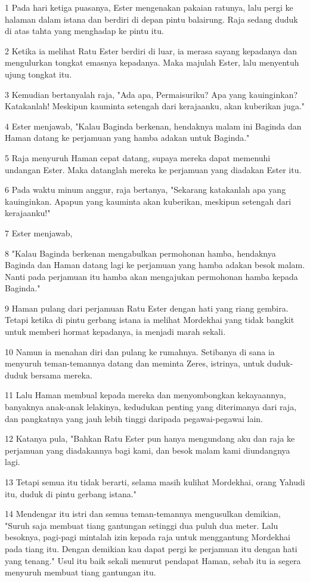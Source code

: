 \par 1 Pada hari ketiga puasanya, Ester mengenakan pakaian ratunya, lalu pergi ke halaman dalam istana dan berdiri di depan pintu balairung. Raja sedang duduk di atas tahta yang menghadap ke pintu itu.
\par 2 Ketika ia melihat Ratu Ester berdiri di luar, ia merasa sayang kepadanya dan mengulurkan tongkat emasnya kepadanya. Maka majulah Ester, lalu menyentuh ujung tongkat itu.
\par 3 Kemudian bertanyalah raja, "Ada apa, Permaisuriku? Apa yang kauinginkan? Katakanlah! Meskipun kauminta setengah dari kerajaanku, akan kuberikan juga."
\par 4 Ester menjawab, "Kalau Baginda berkenan, hendaknya malam ini Baginda dan Haman datang ke perjamuan yang hamba adakan untuk Baginda."
\par 5 Raja menyuruh Haman cepat datang, supaya mereka dapat memenuhi undangan Ester. Maka datanglah mereka ke perjamuan yang diadakan Ester itu.
\par 6 Pada waktu minum anggur, raja bertanya, "Sekarang katakanlah apa yang kauinginkan. Apapun yang kauminta akan kuberikan, meskipun setengah dari kerajaanku!"
\par 7 Ester menjawab,
\par 8 "Kalau Baginda berkenan mengabulkan permohonan hamba, hendaknya Baginda dan Haman datang lagi ke perjamuan yang hamba adakan besok malam. Nanti pada perjamuan itu hamba akan mengajukan permohonan hamba kepada Baginda."
\par 9 Haman pulang dari perjamuan Ratu Ester dengan hati yang riang gembira. Tetapi ketika di pintu gerbang istana ia melihat Mordekhai yang tidak bangkit untuk memberi hormat kepadanya, ia menjadi marah sekali.
\par 10 Namun ia menahan diri dan pulang ke rumahnya. Setibanya di sana ia menyuruh teman-temannya datang dan meminta Zeres, istrinya, untuk duduk-duduk bersama mereka.
\par 11 Lalu Haman membual kepada mereka dan menyombongkan kekayaannya, banyaknya anak-anak lelakinya, kedudukan penting yang diterimanya dari raja, dan pangkatnya yang jauh lebih tinggi daripada pegawai-pegawai lain.
\par 12 Katanya pula, "Bahkan Ratu Ester pun hanya mengundang aku dan raja ke perjamuan yang diadakannya bagi kami, dan besok malam kami diundangnya lagi.
\par 13 Tetapi semua itu tidak berarti, selama masih kulihat Mordekhai, orang Yahudi itu, duduk di pintu gerbang istana."
\par 14 Mendengar itu istri dan semua teman-temannya mengusulkan demikian, "Suruh saja membuat tiang gantungan setinggi dua puluh dua meter. Lalu besoknya, pagi-pagi mintalah izin kepada raja untuk menggantung Mordekhai pada tiang itu. Dengan demikian kau dapat pergi ke perjamuan itu dengan hati yang tenang." Usul itu baik sekali menurut pendapat Haman, sebab itu ia segera menyuruh membuat tiang gantungan itu.

